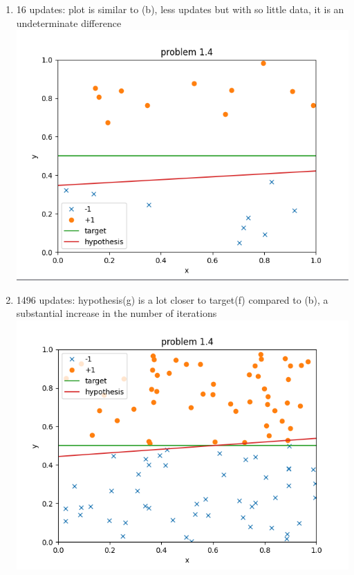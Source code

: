 \documentclass{article}
\begin{document}
\begin{enumerate}
\begin{enumerate}
            \item 16 updates: plot is similar to (b), less updates but with so little data, it is an undeterminate difference \\\includegraphics[scale=0.5]{images/c.png}
            \item 1496 updates: hypothesis(g) is a lot closer to target(f) compared to (b), a substantial increase in the number of iterations \\\includegraphics[scale=0.5]{images/d.png}

\end{enumerate}
\end{enumerate}
\end{document}
